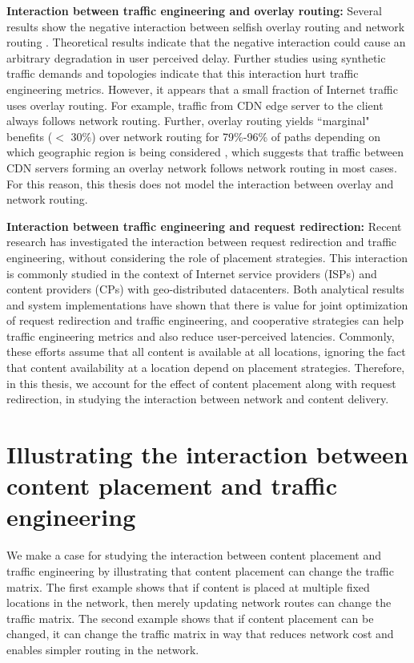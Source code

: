 \textbf{Interaction between traffic engineering and overlay routing:} Several results show the negative interaction between selfish overlay routing and network routing \cite{Roughgarden,selfishQiu}. Theoretical results indicate that the negative interaction could cause an arbitrary degradation in user perceived delay. Further studies using synthetic traffic demands and topologies indicate that this interaction hurt traffic engineering metrics. However, it appears that a small fraction of Internet traffic uses overlay routing.  For example, traffic from CDN edge server to the client always follows network routing. Further, overlay routing yields ``marginal" benefits ($<$ 30\%) over network routing for 79\%-96\% of paths depending on which geographic region is being considered  \cite{rahul2006overlays}, which suggests that traffic between CDN servers forming an overlay network follows network routing in most cases. For this reason, this thesis does not model the interaction between overlay and network routing.


\textbf{Interaction between traffic engineering and request redirection:} Recent research has investigated the interaction between request redirection and traffic engineering, without considering the role of placement strategies. This interaction is commonly studied in the context of Internet service providers (ISPs) and content providers (CPs) with geo-distributed datacenters. 
Both analytical results \cite{Jiang2009,JohariGameTheory} and system implementations \cite{CATE,P4P} have shown that there is value for joint optimization of request redirection and traffic engineering, and cooperative strategies can help traffic engineering metrics and also reduce user-perceived latencies. Commonly, these efforts assume that all content is available at all locations, ignoring the fact that content availability at a location depend on placement strategies. Therefore, in this thesis, we account for the effect of content placement along with request redirection, in studying the interaction between network and content delivery.


\section{Illustrating the interaction between content placement and traffic engineering}

We make a case for studying the interaction between content placement and traffic engineering by illustrating that content placement can change the traffic matrix. The first example shows that if content is placed at multiple fixed locations in the network, then merely updating network routes can change the traffic matrix. The second example shows that if content placement can be changed, it can change the traffic matrix in way that reduces network cost and enables simpler routing in the network.




